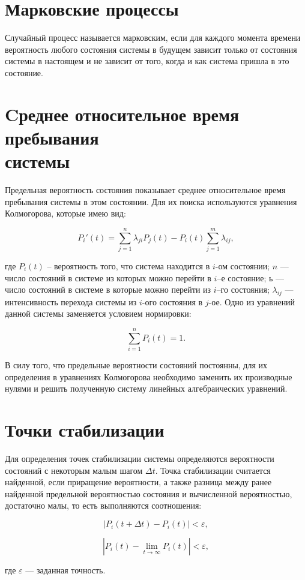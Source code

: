 \section*{Марковские процессы}
Случайный процесс называется марковским, если для каждого момента времени вероятность любого состояния системы в будущем зависит только от состояния системы в настоящем и не зависит от того, когда и как система пришла в это состояние. 

\section*{Cреднее относительное время пребывания\\системы}

Предельная вероятность состояния показывает среднее относительное время пребывания системы в этом состоянии. Для их поиска используются уравнения Колмогорова, которые имею вид:

\begin{equation}
	P_i'(t) = \sum\limits_{j=1}^{n} \lambda_{ji}P_j(t) - P_i(t)
	\sum\limits_{j=1}^{m} \lambda_{ij},
\end{equation}

\noindent где $P_i(t)$ -- вероятность того, что система находится в $i$-ом состоянии; $n$ --- число состояний в системе из которых можно перейти в $i$--е состояние; $ь$ --- число состояний в системе в которые можно перейти из $i$--го состояния; $\lambda_{ij}$ --- интенсивность перехода системы из $i$-ого состояния в $j$-ое.
Одно из уравнений данной системы заменяется условием нормировки:

\begin{equation}
	\sum\limits_{i=1}^{n} P_i(t) = 1.
\end{equation}

В силу того, что предельные вероятности состояний постоянны, для их определения в уравнениях Колмогорова необходимо заменить их производные нулями и решить полученную систему линейных алгебраических уравнений.

\clearpage

\section*{Точки стабилизации}

Для определения точек стабилизации системы определяются вероятности состояний с
некоторым малым шагом $\Delta t$. Точка стабилизации считается найденной, если
приращение вероятности, а также разница между ранее найденной предельной
вероятностью состояния и вычисленной вероятностью, достаточно малы, то есть
выполняются соотношения:

\begin{equation}
	|P_i(t + \Delta t) -  P_i(t)| < \varepsilon,
\end{equation}

\begin{equation}
	|P_i(t) -  \lim_{t \rightarrow \infty} P_i(t)| < \varepsilon,
\end{equation}

где $\varepsilon$ --- заданная точность.